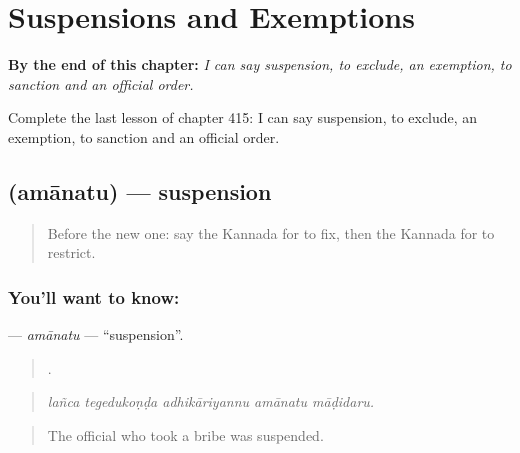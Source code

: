 
\chapter{Suspensions and Exemptions}
\label{ch:ka-suspensions-and-exemptions}

\begin{chapteropening}
\textbf{By the end of this chapter:} \emph{I can say suspension, to exclude, an exemption, to sanction and an official order.}

Complete the last lesson of chapter 415: I can say suspension, to exclude, an exemption, to sanction and an official order.
\end{chapteropening}

\section[\texorpdfstring{\kn{ಅಮಾನತು} (amānatu)}{ಅಮಾನತು (amānatu)}]{ (amānatu) — suspension}

\label{lesson:KA-C415-amanatu}



\begin{quote}
Before the new one: say the Kannada for to fix, then the Kannada for to restrict.
\end{quote}

\subsection*{You'll want to know: }
\textbf{} — \emph{amānatu} — \textquotedblleft{}suspension\textquotedblright{}.

\begin{quote}
    .
\end{quote}

\begin{quote}
\emph{lañca tegedukoṇḍa adhikāriyannu amānatu māḍidaru.}
\end{quote}

\begin{quote}
The official who took a bribe was suspended.
\end{quote}

